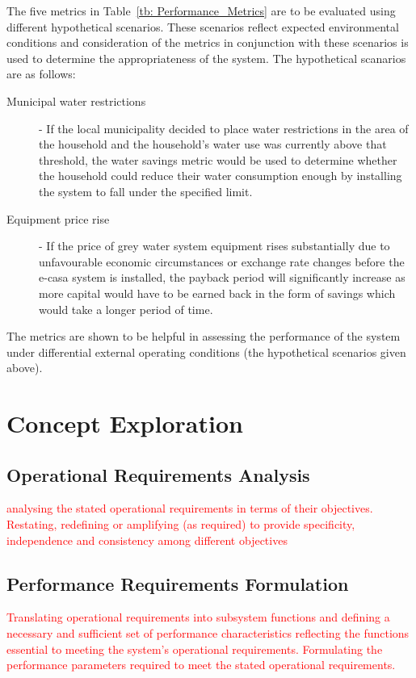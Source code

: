 \documentclass[a4paper,11pt,fleqn]{report}
\begin{document}
The five metrics in Table~\ref{tb: Performance_Metrics} are to be evaluated using different hypothetical scenarios. These scenarios reflect expected environmental conditions and consideration of the metrics in conjunction with these scenarios is used to determine the appropriateness of the system. The hypothetical scanarios are as follows:
%
\begin{description}
	\item[Municipal water restrictions] - If the local municipality decided to place water restrictions in the area of the household and the household's water use was currently above that threshold, the water savings metric would be used to determine whether the household could reduce their water consumption enough by installing the system to fall under the specified limit.
	\item[Equipment price rise] - If the price of grey water system equipment rises substantially due to unfavourable economic circumstances or exchange rate changes before the \ac{e-casa} system is installed, the payback period will significantly increase as more capital would have to be earned back in the form of savings which would take a longer period of time.
\end{description}

The metrics are shown to be helpful in assessing the performance of the system under differential external operating conditions (the hypothetical scenarios given above). 

\section{Concept Exploration}
\subsection{Operational Requirements Analysis}
\textcolor{red}{analysing the stated operational requirements in terms of their objectives. Restating, redefining or amplifying (as required) to provide specificity, independence and consistency among different objectives}

\subsection{Performance Requirements Formulation}
\textcolor{red}{Translating operational requirements into subsystem functions and defining a necessary and sufficient set of performance characteristics reflecting the functions essential to meeting the system’s operational requirements. Formulating the performance parameters required to meet the stated operational requirements.}
\end{document}
